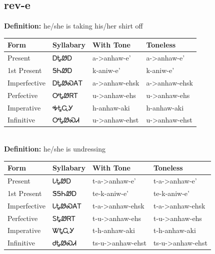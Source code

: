 \documentclass{article}%
\begin{document}
\subsection*{rev-e}%
\textbf{Definition: }%
he/she is taking his/her shirt off%
\\[0.5em]%
\begin{tabular}{|l|l|l|l|}%
\hline%
\textbf{Form}&\textbf{Syllabary}&\textbf{With Tone}&\textbf{Toneless}\\%
\hline%
Present&ᎠᎿᏪᎠ&a{-}>anhaw{-}e'&a{-}>anhaw{-}e'\\%
1st Present&ᎦᏂᏪᎠ&k{-}aniw{-}e'&k{-}aniw{-}e'\\%
Imperfective&ᎠᎿᏪᏍᎪᎢ&a{-}>anhaw{-}ehsk&a{-}>anhaw{-}ehsk\\%
Perfective&ᎤᎿᏪᏒᎢ&u{-}>anhaw{-}ehs&u{-}>anhaw{-}ehs\\%
Imperative&ᎭᎿᏩᎩ&h{-}anhaw{-}aki&h{-}anhaw{-}aki\\%
Infinitive&ᎤᎿᏪᏍᏗ&u{-}>anhaw{-}ehst&u{-}>anhaw{-}ehst\\%
\hline%
\end{tabular}%
\\[1em]%
\textbf{Definition: }%
he/she is undressing%
\\[0.5em]%
\begin{tabular}{|l|l|l|l|}%
\hline%
\textbf{Form}&\textbf{Syllabary}&\textbf{With Tone}&\textbf{Toneless}\\%
\hline%
Present&ᏓᎿᏪᎠ&t{-}a{-}>anhaw{-}e'&t{-}a{-}>anhaw{-}e'\\%
1st Present&ᏕᎦᏂᏪᎠ&te{-}k{-}aniw{-}e'&te{-}k{-}aniw{-}e'\\%
Imperfective&ᏓᎿᏪᏍᎪᎢ&t{-}a{-}>anhaw{-}ehsk&t{-}a{-}>anhaw{-}ehsk\\%
Perfective&ᏚᎿᏪᏒᎢ&t{-}u{-}>anhaw{-}ehs&t{-}u{-}>anhaw{-}ehs\\%
Imperative&ᏔᎿᏩᎩ&t{-}h{-}anhaw{-}aki&t{-}h{-}anhaw{-}aki\\%
Infinitive&ᏧᎿᏪᏍᏗ&ts{-}u{-}>anhaw{-}ehst&ts{-}u{-}>anhaw{-}ehst\\%
\hline%
\end{tabular}%
\\[1em]%
\end{document}
